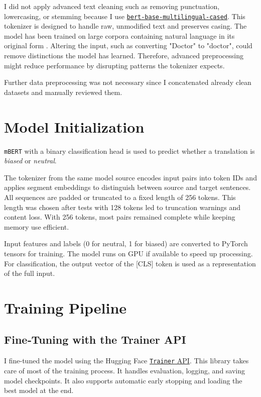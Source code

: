     I did not apply advanced text cleaning such as removing punctuation, lowercasing, or stemming because I use \href{https://huggingface.co/google-bert/bert-base-multilingual-cased}{\texttt{bert-base-multilingual-cased}}. This tokenizer is designed to handle raw, unmodified text and preserves casing. The model has been trained on large corpora containing natural language in its original form \parencite{devlinBERTPretrainingDeep2019}. Altering the input, such as converting "Doctor" to "doctor", could remove distinctions the model has learned. Therefore, advanced preprocessing might reduce performance by disrupting patterns the tokenizer expects.

Further data preprocessing was not necessary since I concatenated already clean datasets and manually reviewed them.

\section{Model Initialization}
    \texttt{mBERT} with a binary classification head is used to predict whether a translation is \textit{biased} or \textit{neutral}.

    The tokenizer from the same model source encodes input pairs into token IDs and applies segment embeddings to distinguish between source and target sentences. All sequences are padded or truncated to a fixed length of 256 tokens. This length was chosen after tests with 128 tokens led to truncation warnings and content loss. With 256 tokens, most pairs remained complete while keeping memory use efficient.

    Input features and labels (0 for neutral, 1 for biased) are converted to PyTorch tensors for training. The model runs on GPU if available to speed up processing. For classification, the output vector of the [CLS] token is used as a representation of the full input.

\section{Training Pipeline}
\subsection{{Fine‑Tuning with the Trainer API}}
    I fine-tuned the model using the Hugging Face \href{https://huggingface.co/docs/transformers/en/main_classes/trainer}{\texttt{Trainer} API}. This library takes care of most of the training process. It handles evaluation, logging, and saving model checkpoints. It also supports automatic early stopping and loading the best model at the end.

